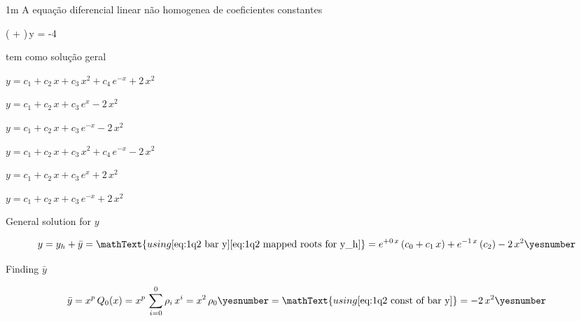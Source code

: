 \documentclass["AM3C-tests_resolutions.tex"]{subfiles}
\begin{document}
\begin{questionBox}1m{} %
  A equação diferencial linear não homogenea de coeficientes constantes
  \begin{BM}
    ( + )\,y = -4
  \end{BM}
  tem como solução geral
  \begin{itemize}[label=\square]
    \begin{multicols}{2}
      \item \(y=c_1+c_2\,x+c_3\,x^2+c_4\,e^{-x}+2\,x^2\)
      \item \(y=c_1+c_2\,x+c_3\,e^{x}-2\,x^2\)
      \item[\blacksquare] \(y=c_1+c_2\,x+c_3\,e^{-x}-2\,x^2\)
      \item \(y=c_1+c_2\,x+c_3\,x^2+c_4\,e^{-x}-2\,x^2\)
      \item \(y=c_1+c_2\,x+c_3\,e^{x}+2\,x^2\)
      \item \(y=c_1+c_2\,x+c_3\,e^{-x}+2\,x^2\)
      \end{multicols}
  \end{itemize}


  \answer{\eqref{eq:1q2 answer}}

  General solution for \(y\)
  \begin{tcolorbox}
    \begin{gather*}
      y
      = y_h 
      + \bar{y}
      = \mathText{using 
        \eqref{eq:1q2 bar y}
        \eqref{eq:1q2 mapped roots for y_h}
      }
      = e^{+0\,x}\,(c_0+c_1\,x)
      + e^{-1\,x}\,(c_2)
      - 2\,x^2
      \yesnumber\label{eq:1q2 answer}
    \end{gather*}
  \end{tcolorbox}



  Finding \(\bar{y}\)
  \begin{tcolorbox}
    \begin{gather*}
      \bar{y}
      = x^p
      \,Q_0(x)
      = x^p
      \,\sum_{i=0}^{0}{
        \rho_i\,x^i
      }
      = x^2\,\rho_0
      \yesnumber\label{eq:1q2 bar y (const)}
      = \mathText{using \eqref{eq:1q2 const of bar y}}
      = -2\,x^2
      \yesnumber\label{eq:1q2 bar y}
    \end{gather*}
  \end{tcolorbox}


\end{questionBox}
\end{document}
